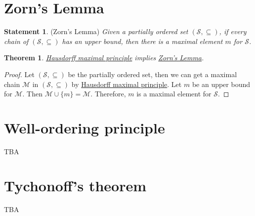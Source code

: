 \documentclass[12pt]{amsart}
\numberwithin{equation}{section}
\theoremstyle{plain} %
\newtheorem{theorem}[equation]{Theorem}
\theoremstyle{definition}
\newtheorem{statement}[equation]{Statement}
\theoremstyle{remark}
\begin{document}
\section{Zorn's Lemma}

\begin{statement}
\label{statement:Zorn's Lemma}
(Zorn's Lemma) \textit{Given a partially ordered set $(\mathcal{S}, \subseteq)$, if every chain of $(\mathcal{S}, \subseteq)$ has an upper bound, then there is a maximal element $m$ for $\mathcal{S}$. }
\end{statement}

\begin{theorem}
\hyperref[statement:Hausdorff maximal principle]{Hausdorff maximal principle} implies \hyperref[statement:Zorn's Lemma]{Zorn's Lemma}.
\end{theorem}

\begin{proof}
Let $(\mathcal{S}, \subseteq)$ be the partially ordered set, then we can get a maximal chain  $\mathcal{M}$ in $(\mathcal{S}, \subseteq)$ by \hyperref[statement:Hausdorff maximal principle]{Hausdorff maximal principle}. Let $m$ be an upper bound for $\mathcal{M}$. Then $\mathcal{M} \cup \{m\} = \mathcal{M}$. Therefore, $m$ is a maximal element for $\mathcal{S}$. 
\end{proof}

\section{Well-ordering principle}
TBA

\section{Tychonoff's theorem}
TBA


\begin{bibdiv}
\end{bibdiv}
\end{document}
